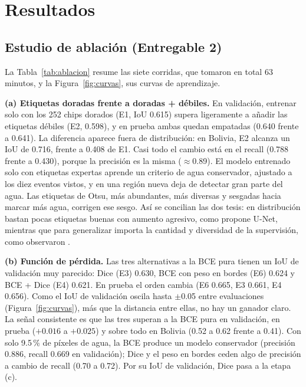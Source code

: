 \documentclass[10pt]{article}
\begin{document}
\section{Resultados}
\label{sec:res}
\subsection{Estudio de ablación (Entregable 2)}

La Tabla~\ref{tab:ablacion} resume las siete corridas, que tomaron en total 63 minutos, y la Figura~\ref{fig:curvas}, sus curvas de aprendizaje.

\textbf{(a) Etiquetas doradas frente a doradas + débiles.} En validación, entrenar solo con los 252 chips dorados (E1, IoU 0.615) supera ligeramente a añadir las etiquetas débiles (E2, 0.598), y en prueba ambas quedan empatadas (0.640 frente a 0.641). La diferencia aparece fuera de distribución: en Bolivia, E2 alcanza un IoU de 0.716, frente a 0.408 de E1. Casi todo el cambio está en el recall (0.788 frente a 0.430), porque la precisión es la misma ($\approx$0.89). El modelo entrenado solo con etiquetas expertas aprende un criterio de agua conservador, ajustado a los diez eventos vistos, y en una región nueva deja de detectar gran parte del agua. Las etiquetas de Otsu, más abundantes, más diversas y sesgadas hacia marcar más agua, corrigen ese sesgo. Así se concilian las dos tesis: en distribución bastan pocas etiquetas buenas con aumento agresivo, como propone U-Net, mientras que para generalizar importa la cantidad y diversidad de la supervisión, como observaron \citet{bonafilia2020}.

\textbf{(b) Función de pérdida.} Las tres alternativas a la BCE pura tienen un IoU de validación muy parecido: Dice (E3) 0.630, BCE con peso en bordes (E6) 0.624 y BCE + Dice (E4) 0.621. En prueba el orden cambia (E6 0.665, E3 0.661, E4 0.656). Como el IoU de validación oscila hasta $\pm$0.05 entre evaluaciones (Figura~\ref{fig:curvas}), más que la distancia entre ellas, no hay un ganador claro. La señal consistente es que las tres superan a la BCE pura en validación, en prueba ($+0.016$ a $+0.025$) y sobre todo en Bolivia (0.52 a 0.62 frente a 0.41). Con solo 9.5\,\% de píxeles de agua, la BCE produce un modelo conservador (precisión 0.886, recall 0.669 en validación); Dice y el peso en bordes ceden algo de precisión a cambio de recall (0.70 a 0.72). Por su IoU de validación, Dice pasa a la etapa (c).
\end{document}
